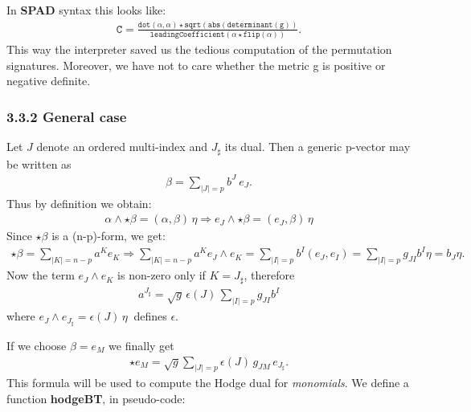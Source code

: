 \documentclass[letterpaper,10pt,english]{sphinxmanual}
\begin{document}
In \textbf{SPAD} syntax this looks like:
\begin{equation*}
\begin{split}\mathtt{C =}  \frac{\mathtt{dot} (\alpha, \alpha) \star
 \mathtt{sqrt\left(abs\left(\right.determinant\left(g\right)\right)}}{\mathtt{leadingCoefficient}
 \left( \alpha \star \mathtt{flip} (\alpha) \right)} .\end{split}
\end{equation*}
This way the interpreter saved us the tedious computation of the permutation
signatures. Moreover, we have not to care whether the metric g is positive or
negative definite.


\subsubsection{3.3.2 General case}
\label{section-3.0:general-case}
Let \(J\) denote an ordered multi-index and \(J_\sharp\) its dual.
Then a generic p-vector may be written as
\begin{equation*}
\begin{split}\beta = \sum_{|J|=p} b^J \ e_J.\end{split}
\end{equation*}
Thus by definition we obtain:
\begin{equation*}
\begin{split}\alpha\wedge\star\beta=(\alpha,\beta)\,\eta \Rightarrow
e_J\wedge\star\beta=(e_J,\beta)\,\eta\end{split}
\end{equation*}
Since \(\star\beta\) is a (n-p)-form, we get:
\begin{equation*}
\begin{split}\star\beta=\sum_{|K|=n-p} a^K e_K \Rightarrow
\sum_{|K|=n-p} a^K e_J\wedge e_K=\sum_{|I|=p} b^I (e_J,e_I)=
\sum_{|I|=p} g_{JI} b^I \eta = b_J \eta.\end{split}
\end{equation*}
Now the term \(e_J\wedge e_K\) is non-zero only if \(K=J_\sharp\),
therefore
\begin{equation*}
\begin{split}a^{J_\sharp} =\sqrt{g}\, \epsilon(J)\, \sum_{|I|=p} g_{JI} b^I\end{split}
\end{equation*}
where \(e_J\wedge e_{J_\sharp}=\epsilon(J)\, \eta\ \) defines
\(\epsilon\).

If we choose \(\beta=e_M\) we finally get
\begin{equation*}
\begin{split}\star e_M = \sqrt{g} \sum_{|J|=p} \epsilon(J)\, g_{JM}\, e_{J_\sharp}.\end{split}
\end{equation*}
This formula will be used to compute the Hodge dual for \emph{monomials}. We define
a function \textbf{hodgeBT}, in pseudo-code:
\end{document}
